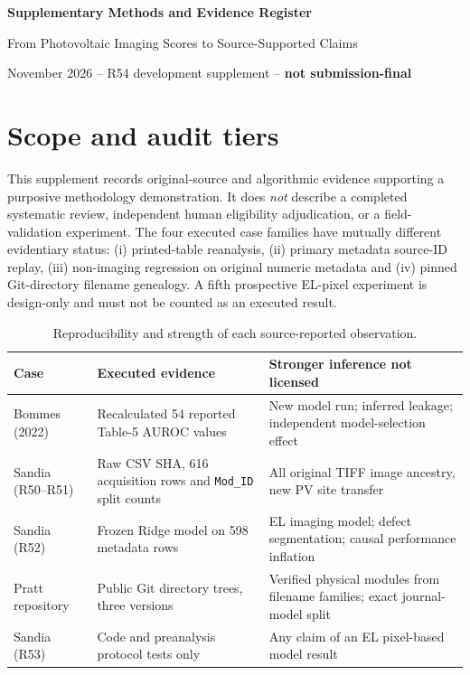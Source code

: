 \documentclass[10pt,a4paper]{article}
\begin{document}
\begin{center}
{\Large \bfseries Supplementary Methods and Evidence Register}\par
\medskip
{\normalsize From Photovoltaic Imaging Scores to Source-Supported Claims}\par
{} November 2026 -- R54 development supplement -- \textbf{not submission-final}
\end{center}
\section{Scope and audit tiers}
This supplement records original-source and algorithmic evidence supporting a purposive methodology demonstration. It does \emph{not} describe a completed systematic review, independent human eligibility adjudication, or a field-validation experiment. The four executed case families have mutually different evidentiary status: (i) printed-table reanalysis, (ii) primary metadata source-ID replay, (iii) non-imaging regression on original numeric metadata and (iv) pinned Git-directory filename genealogy. A fifth prospective EL-pixel experiment is design-only and must not be counted as an executed result.

\begin{table}[ht]\centering\small
\caption{Reproducibility and strength of each source-reported observation.}
\begin{tabularx}{\linewidth}{@{}p{2.5cm}p{2.3cm}X@{}}\toprule
Case & Executed evidence & Stronger inference not licensed \\\midrule
Bommes (2022) & Recalculated 54 reported Table-5 AUROC values & New model run; inferred leakage; independent model-selection effect \\
Sandia (R50--R51) & Raw CSV SHA, 616 acquisition rows and \texttt{Mod\_ID} split counts & All original TIFF image ancestry, new PV site transfer \\
Sandia (R52) & Frozen Ridge model on 598 metadata rows & EL imaging model; defect segmentation; causal performance inflation \\
Pratt repository & Public Git directory trees, three versions & Verified physical modules from filename families; exact journal-model split \\
Sandia (R53) & Code and preanalysis protocol tests only & Any claim of an EL pixel-based model result \\
\bottomrule\end{tabularx}
\end{table}
\end{document}
